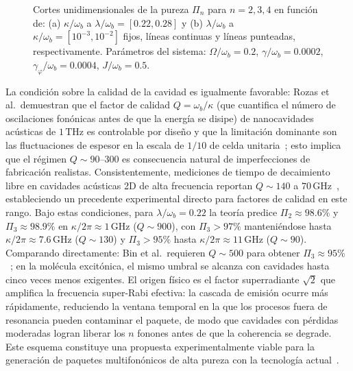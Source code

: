 \begin{figure}[H]
	\centering
	
	\caption{Cortes unidimensionales de la pureza $\Pi_n$ para $n=2,3,4$ en función de: (a) $\kappa/\omega_b$ a $\lambda/\omega_b = [0.22, 0.28]$ y (b) $\lambda/\omega_b$ a $\kappa/\omega_b = [10^{-3}, 10^{-2}]$ fijos, líneas continuas y líneas punteadas, respectivamente. Parámetros del sistema: $\Omega/\omega_b = 0.2$, $\gamma/\omega_b = 0.0002$, $\gamma_\varphi/\omega_b = 0.0004$, $J/\omega_b = 0.5$.}
	\label{fig:purity_2qd_cuts}
\end{figure}

La condición sobre la calidad de la cavidad es igualmente favorable: Rozas et al.\ demuestran que el factor de calidad $Q = \omega_b/\kappa$ (que cuantifica el número de oscilaciones fonónicas antes de que la energía se disipe) de nanocavidades acústicas de $1\,\mathrm{THz}$ es controlable por diseño y que la limitación dominante son las fluctuaciones de espesor en la escala de $1/10$ de celda unitaria~\cite{rozas2009}; esto implica que el régimen $Q \sim 90$--$300$ es consecuencia natural de imperfecciones de fabricación realistas. Consistentemente, mediciones de tiempo de decaimiento libre en cavidades acústicas 2D de alta frecuencia reportan $Q \sim 140$ a $70\,\mathrm{GHz}$~\cite{zalalutdinov2021}, estableciendo un precedente experimental directo para factores de calidad en este rango. Bajo estas condiciones, para $\lambda/\omega_b = 0.22$ la teoría predice $\Pi_2 \approx 98.6\%$ y $\Pi_3 \approx 98.9\%$ en $\kappa/2\pi \approx 1\,\mathrm{GHz}$ ($Q \sim 900$), con $\Pi_3 > 97\%$ manteniéndose hasta $\kappa/2\pi \approx 7.6\,\mathrm{GHz}$ ($Q \sim 130$) y $\Pi_3 > 95\%$ hasta $\kappa/2\pi \approx 11\,\mathrm{GHz}$ ($Q \sim 90$). Comparando directamente: Bin et al.\ requieren $Q \sim 500$ para obtener $\Pi_3 \approx 95\%$~\cite{bin2020}; en la molécula excitónica, el mismo umbral se alcanza con cavidades hasta cinco veces menos exigentes. El origen físico es el factor superradiante $\sqrt{2}$ que amplifica la frecuencia super-Rabi efectiva: la cascada de emisión ocurre más rápidamente, reduciendo la ventana temporal en la que los procesos fuera de resonancia pueden contaminar el paquete, de modo que cavidades con pérdidas moderadas logran liberar los $n$ fonones antes de que la coherencia se degrade. Este esquema constituye una propuesta experimentalmente viable para la generación de paquetes multifonónicos de alta pureza con la tecnología actual~\cite{weig2004,rozas2009,zalalutdinov2021}.

